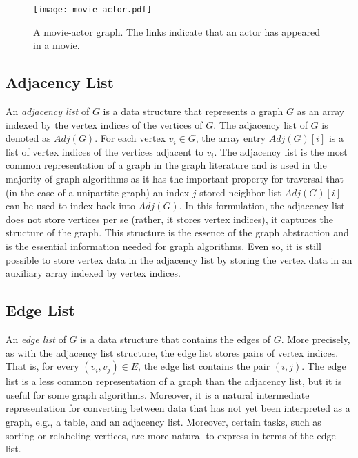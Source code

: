 \begin{figure}[ht]
  \begin{center}
    \texttt{[image: movie\_actor.pdf]}\label{fig:movie_actor}
    \caption{A movie-actor graph. The links indicate that an actor has appeared in a movie.\label{fig:movie_actor}}
  \end{center}
\end{figure}

\subsection{Adjacency List}

An \emph{adjacency list} of $G$ is a data structure that represents a graph $G$ as an array
indexed by the vertex indices of the vertices of $G$.
The adjacency list of $G$ is denoted as $Adj(G)$.
For each vertex $v_i \in G$, the array entry $Adj(G)[i]$ is a list of
vertex indices of the vertices adjacent to $v_i$.
The adjacency list is the most common representation of a graph in the graph literature
and is used in the majority of graph algorithms as it has the important
property for traversal that (in the case of a unipartite graph)
an index $j$ stored neighbor list $Adj(G)[i]$ can
be used to index back into $Adj(G)$. In this formulation, the adjacency list
does not store vertices per se (rather, it stores vertex indices), it captures the
structure of the graph. This structure is the essence of the graph abstraction and
is the essential information needed for graph algorithms.
Even so, it is still possible to store vertex data in the adjacency list by storing
the vertex data in an auxiliary array indexed by vertex indices.

\subsection{Edge List}

An \emph{edge list} of $G$ is a data structure that contains the edges of $G$. More precisely, as
with the adjacency list structure, the edge list stores pairs of vertex indices. That is, for
every $(v_i, v_j) \in E$, the edge list contains the pair $(i, j)$. The edge list is
a less common representation of a graph than the adjacency list, but it is useful for
some graph algorithms. Moreover, it is a natural intermediate representation for
converting between data that has not yet been interpreted as a graph, e.g., a table,
and an adjacency list. Moreover, certain tasks, such as sorting or relabeling vertices, are
more natural to express in terms of the edge list.

